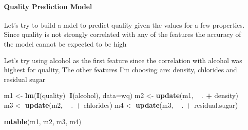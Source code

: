 \documentclass[]{article}
\newenvironment{Shaded}{\begin{snugshade}}{\end{snugshade}}
\newcommand{\KeywordTok}[1]{\textcolor[rgb]{0.13,0.29,0.53}{\textbf{#1}}}
\newcommand{\DataTypeTok}[1]{\textcolor[rgb]{0.13,0.29,0.53}{#1}}
\newcommand{\StringTok}[1]{\textcolor[rgb]{0.31,0.60,0.02}{#1}}
\newcommand{\OperatorTok}[1]{\textcolor[rgb]{0.81,0.36,0.00}{\textbf{#1}}}
\newcommand{\NormalTok}[1]{#1}
\let\oldparagraph\paragraph
\renewcommand{\paragraph}[1]{\oldparagraph{#1}\mbox{}}
\begin{document}
\paragraph{Quality Prediction Model}\label{quality-prediction-model}

Let's try to build a mdel to predict quality given the values for a few
properties. Since quality is not strongly correlated with any of the
features the accuracy of the model cannot be expected to be high

Let's try using alcohol as the first feature since the correlation with
alcohol was highest for quality, The other features I'm choosing are:
density, chlorides and residual sugar

\begin{Shaded}
\begin{Highlighting}[]
\NormalTok{m1 <-}\StringTok{ }\KeywordTok{lm}\NormalTok{(}\KeywordTok{I}\NormalTok{(quality)}\OperatorTok{~}\KeywordTok{I}\NormalTok{(alcohol), }\DataTypeTok{data=}\NormalTok{wq)}
\NormalTok{m2 <-}\StringTok{ }\KeywordTok{update}\NormalTok{(m1, }\OperatorTok{~}\StringTok{ }\NormalTok{. }\OperatorTok{+}\StringTok{ }\NormalTok{density)}
\NormalTok{m3 <-}\StringTok{ }\KeywordTok{update}\NormalTok{(m2, }\OperatorTok{~}\StringTok{ }\NormalTok{. }\OperatorTok{+}\StringTok{ }\NormalTok{chlorides)}
\NormalTok{m4 <-}\StringTok{ }\KeywordTok{update}\NormalTok{(m3, }\OperatorTok{~}\StringTok{ }\NormalTok{. }\OperatorTok{+}\StringTok{ }\NormalTok{residual.sugar)}

\KeywordTok{mtable}\NormalTok{(m1, m2, m3, m4)}
\end{Highlighting}
\end{Shaded}
\end{document}
